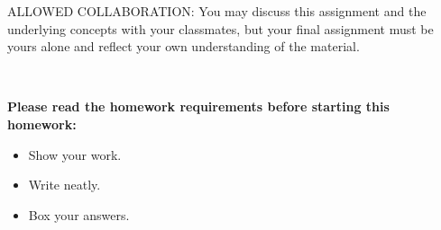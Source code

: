 \documentclass[11pt,letterpaper]{article} %
\begin{document}
ALLOWED COLLABORATION: You may discuss this assignment and the underlying concepts with your classmates, but your final assignment must be yours alone and reflect your own understanding of the material.

~

{\bf Please read the homework requirements before starting this homework:}

\begin{itemize}                        %
    \item  Show your work.

    \item  Write neatly.

    \item  Box your answers.
		
\end{itemize}

\vfill \vfill \vfill

\clearpage


\begin{problem}{10}
\let\clearpage\relax

\end{problem}



%


%

\end{document}
